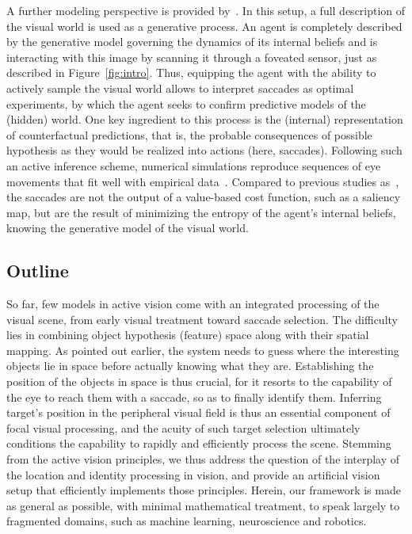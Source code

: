 %
A further modeling perspective is provided by~\cite{Friston12}. In this setup, a full description of the visual world is used as a generative process. An agent is completely described by the generative model governing the dynamics of its internal beliefs and is interacting with this image by scanning it through a foveated sensor, just as described in Figure~\ref{fig:intro}. Thus, equipping the agent with the ability to actively sample the visual world allows to interpret saccades as optimal experiments, by which the agent seeks to confirm predictive models of the (hidden) world. One key ingredient to this process is the (internal) representation of counterfactual predictions, that is, the probable consequences of possible hypothesis as they would be realized into actions (here, saccades). Following such an active inference scheme, numerical simulations reproduce sequences of eye movements that fit well with empirical data~\cite{Mirza18}. Compared to previous studies as~\cite{Najemnik05}, the saccades are not the output of a value-based cost function, such as a saliency map, but are the result of minimizing the entropy of the agent's internal beliefs, knowing the generative model of the visual world.
%
\subsection{Outline}
%
So far, few models in active vision come with an integrated processing of the visual scene, from early visual treatment toward saccade selection. The difficulty lies in combining object hypothesis (feature) space along with their spatial mapping. As pointed out earlier, the system needs to guess where the interesting objects lie in space before actually knowing what they are. Establishing the position of the objects in space is thus crucial, for it resorts to the capability of the eye to reach them with a saccade, so as to finally identify them. Inferring target's position in the peripheral visual field is thus an essential component of focal visual processing, and the acuity of such target selection ultimately conditions the capability to rapidly and efficiently process the scene. Stemming from the active vision principles, we thus address the question of the interplay of the location and identity processing in vision, and provide an artificial vision setup that efficiently implements those principles. 
Herein, our framework is made as general as possible, with minimal mathematical treatment, to speak largely to fragmented domains, such as machine learning, neuroscience and robotics.

